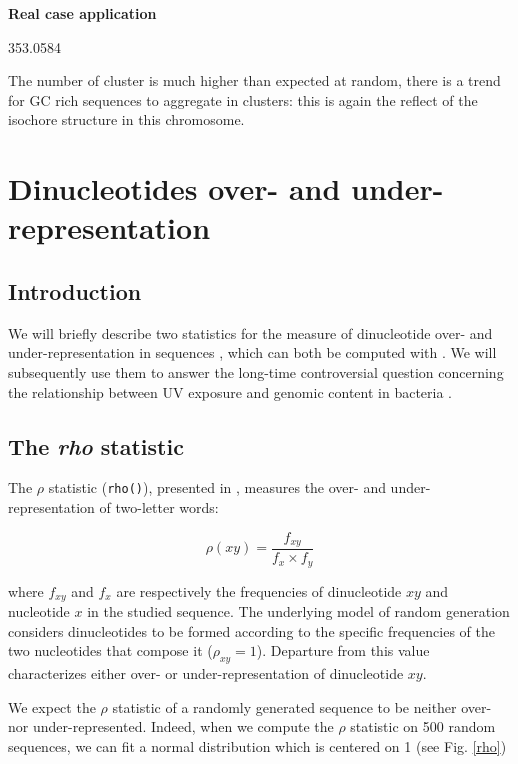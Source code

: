 \documentclass{article}
\begin{document}
\noindent\textbf{Real case application}

\begin{Schunk}
\begin{Soutput}
[1] 353.0584
\end{Soutput}
\end{Schunk}

The number of cluster is much higher than expected at random, there is a trend for
GC rich sequences to aggregate in clusters: this is again the reflect of the isochore
structure in this chromosome.

\section{Dinucleotides over- and under-representation}
\label{dinu}

\subsection{Introduction}

We will briefly describe two statistics for the measure of
dinucleotide over- and under-representation in sequences
\cite{Karlin,UV}, which can both be computed with \seqinr{}. We will
subsequently use them to answer the long-time controversial question
concerning the relationship between UV exposure and genomic content in
bacteria \cite{Singer,Bak}.

\subsection{The \textit{rho} statistic}

The $\rho$ statistic (\texttt{rho()}), presented in \cite{Karlin},
measures the over- and under-representation of two-letter words:

$$\rho(xy) = \frac{f_{xy}}{f_{x}\times f_{y}}$$

where $f_{xy}$ and $f_{x}$ are respectively the frequencies of
dinucleotide $xy$ and nucleotide $x$ in the studied sequence. The
underlying model of random generation considers dinucleotides to be
formed according to the specific frequencies of the two nucleotides
that compose it ($\rho_{xy} = 1$). Departure from this value
characterizes either over- or under-representation of dinucleotide
$xy$.


We expect the $\rho$ statistic of a randomly generated sequence to be
neither over- nor under-represented. Indeed, when we compute the
$\rho$ statistic on 500 random
sequences, we can fit a normal distribution which is centered on 1
(see Fig. \ref{rho})
\end{document}
